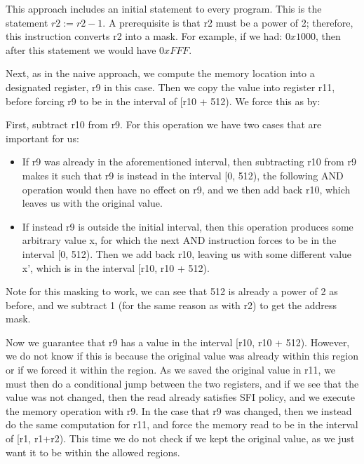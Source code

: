 This approach includes an initial statement to every program. This is the
statement $r2 := r2 - 1$. A prerequisite is that r2 must be a power of 2;
therefore, this instruction converts r2 into a mask. For example, if we had:
$0x1000$, then after this statement we would have $0xFFF$.

Next, as in the naive approach, we compute the memory location into a
designated register, r9 in this case. Then we copy the value into register r11,
before forcing r9 to be in the interval of [r10 + 512). We force this as by:

First, subtract r10 from r9. For this operation we have two cases that are
important for us: 
\begin{itemize}
  \item If r9 was already in the aforementioned interval, then subtracting r10
    from r9 makes it such that r9 is instead in the interval [0, 512), the
    following AND operation would then have no effect on r9, and we then add
    back r10, which leaves us with the original value.
  \item If instead r9 is outside the initial interval, then this operation
    produces some arbitrary value x, for which the next AND instruction forces
    to be in the interval [0, 512). Then we add back r10, leaving us with some
    different value x', which is in the interval [r10, r10 + 512).
\end{itemize}

Note for this masking to work, we can see that 512 is already a power of 2 as
before, and we subtract 1 (for the same reason as with r2) to get the address
mask.

Now we guarantee that r9 has a value in the interval [r10, r10 + 512). However,
we do not know if this is because the original value was already within this
region or if we forced it within the region. As we saved the original value in
r11, we must then do a conditional jump between the two registers, and if we
see that the value was not changed, then the read already satisfies SFI policy,
and we execute the memory operation with r9. In the case that r9 was changed,
then we instead do the same computation for r11, and force the memory read to
be in the interval of [r1, r1+r2). This time we do not check if we kept the
original value, as we just want it to be within the allowed regions.
